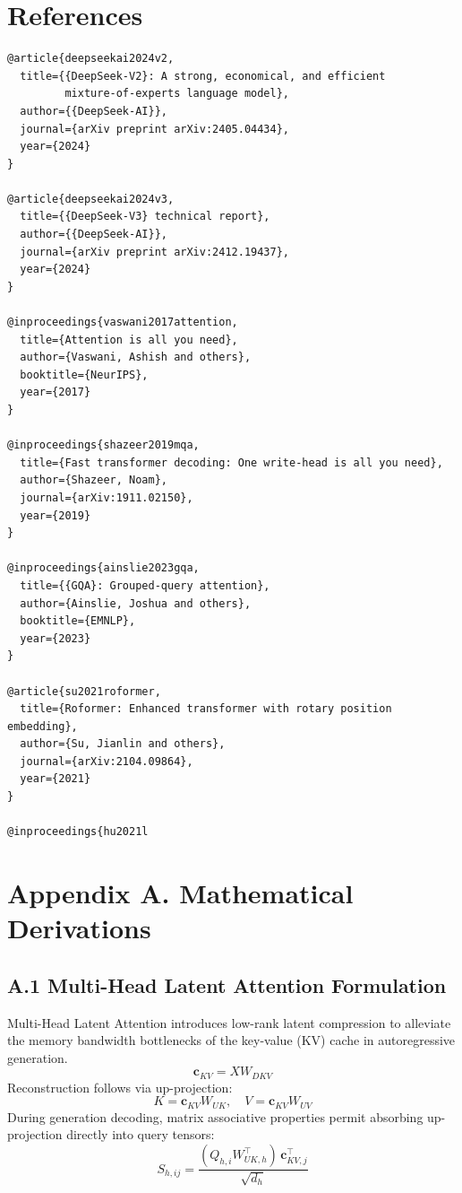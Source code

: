 
\section{References}

\begin{lstlisting}
@article{deepseekai2024v2,
  title={{DeepSeek-V2}: A strong, economical, and efficient 
         mixture-of-experts language model},
  author={{DeepSeek-AI}},
  journal={arXiv preprint arXiv:2405.04434},
  year={2024}
}

@article{deepseekai2024v3,
  title={{DeepSeek-V3} technical report},
  author={{DeepSeek-AI}},
  journal={arXiv preprint arXiv:2412.19437},
  year={2024}
}

@inproceedings{vaswani2017attention,
  title={Attention is all you need},
  author={Vaswani, Ashish and others},
  booktitle={NeurIPS},
  year={2017}
}

@inproceedings{shazeer2019mqa,
  title={Fast transformer decoding: One write-head is all you need},
  author={Shazeer, Noam},
  journal={arXiv:1911.02150},
  year={2019}
}

@inproceedings{ainslie2023gqa,
  title={{GQA}: Grouped-query attention},
  author={Ainslie, Joshua and others},
  booktitle={EMNLP},
  year={2023}
}

@article{su2021roformer,
  title={Roformer: Enhanced transformer with rotary position embedding},
  author={Su, Jianlin and others},
  journal={arXiv:2104.09864},
  year={2021}
}

@inproceedings{hu2021l
\end{lstlisting}

\section{Appendix A. Mathematical Derivations}
\subsection{A.1 Multi-Head Latent Attention Formulation}
Multi-Head Latent Attention introduces low-rank latent compression to alleviate the memory bandwidth bottlenecks of the key-value (KV) cache in autoregressive generation.
\begin{equation}
\mathbf{c}_{KV} = X W_{DKV}
\end{equation}
Reconstruction follows via up-projection:
\begin{equation}
K = \mathbf{c}_{KV} W_{UK}, \quad V = \mathbf{c}_{KV} W_{UV}
\end{equation}
During generation decoding, matrix associative properties permit absorbing up-projection directly into query tensors:
\begin{equation}
S_{h, ij} = \frac{(Q_{h, i} W_{UK, h}^\top) \, \mathbf{c}_{KV, j}^\top}{\sqrt{d_h}}
\end{equation}


